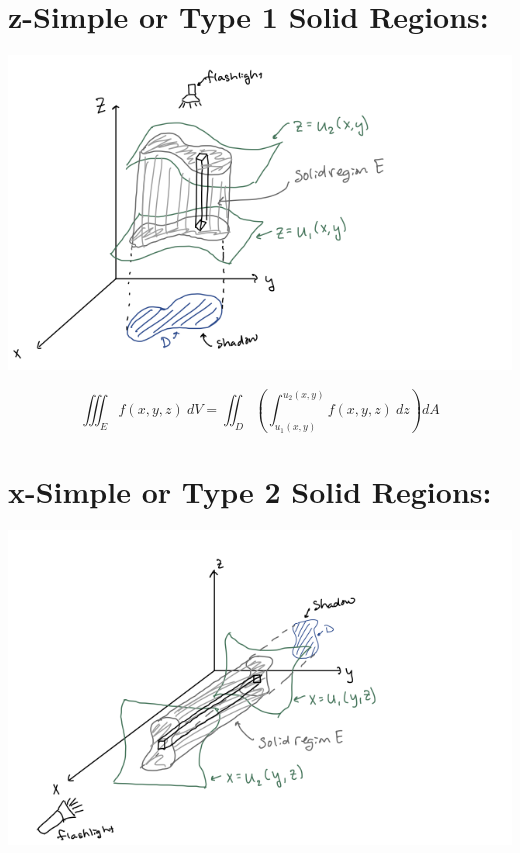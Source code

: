 \setlength{\columnseprule}{0.4pt}
\setlength{\columnsep}{3em}

\hspace*{-.8in}%
%

\section*{z-Simple or Type 1 Solid Regions:}


\includegraphics[width=\columnwidth]{Ch12s5-zSimple.png}

\[
\iiint_E f(x,y,z)\ dV = \iint_D \left(\int_{u_1(x,y)}^{u_2(x,y)} f(x,y,z)\ dz\right) dA
\]


\section*{x-Simple or Type 2 Solid Regions:}


\includegraphics[width=\columnwidth]{Ch12s5-xSimple.png}

